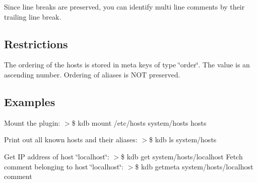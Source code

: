 Since line breaks are preserved, you can identify multi line comments by their trailing line break.

\subsection*{Restrictions}

The ordering of the hosts is stored in meta keys of type \char`\"{}order\char`\"{}. The value is an ascending number. Ordering of aliases is N\+O\+T preserved.

\subsection*{Examples}

Mount the plugin\+: $>$\$ kdb mount /etc/hosts system/hosts hosts

Print out all known hosts and their aliases\+: $>$\$ kdb ls system/hosts

Get I\+P address of host \char`\"{}localhost\char`\"{}\+: $>$\$ kdb get system/hosts/localhost Fetch comment belonging to host \char`\"{}localhost\char`\"{}\+: $>$\$ kdb getmeta system/hosts/localhost comment 